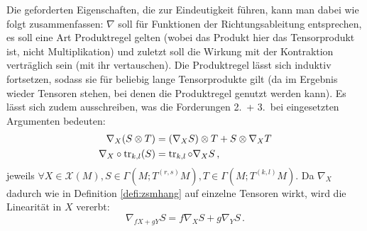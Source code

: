 \documentclass[../H_Analysis_main.tex]{subfiles}
\begin{document}
Die geforderten Eigenschaften, die zur Eindeutigkeit führen, kann man dabei wie folgt zusammenfassen: $\nabla$ soll für Funktionen der Richtungsableitung entsprechen, es soll eine Art Produktregel gelten (wobei das Produkt hier das Tensorprodukt ist, nicht Multiplikation) und zuletzt soll die Wirkung mit der Kontraktion verträglich sein (mit ihr vertauschen). Die Produktregel lässt sich induktiv fortsetzen, sodass sie für beliebig lange Tensorprodukte gilt (da im Ergebnis wieder Tensoren stehen, bei denen die Produktregel genutzt werden kann). Es lässt sich zudem ausschreiben, was die Forderungen 2.~+ 3.~bei eingesetzten Argumenten bedeuten:
\begin{align*}
\nabla_X(S \otimes T) &= (\nabla_X S) \otimes T + S \otimes \nabla_X T 
\\
\nabla_X \circ \tr_{k, l}(S) &= \tr_{k, l} \circ \nabla_X S \, ,
\end{align*}
jeweils $\forall X \in \mathcal{X}(M), S \in \Gamma(M; T^{(r, s)}M), T \in \Gamma(M; T^{(k, l)}M)$. Da $\nabla_X$ dadurch wie in Definition \ref{defi:zsmhang} auf einzelne Tensoren wirkt, wird die Linearität in $X$ vererbt:
\begin{equation}
\nabla_{f X + g Y} S = f \nabla_X S + g \nabla_Y S \, .
\end{equation}
\end{document}
